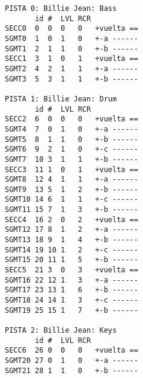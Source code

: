 \begin{verbatim}
PISTA 0: Billie Jean: Bass 
       id #  LVL RCR
SECC0  0  0  0   0   +vuelta ==
SGMT0  1  0  1   0   +-a ------
SGMT1  2  1  1   0   +-b ------
SECC1  3  1  0   1   +vuelta ==
SGMT2  4  2  1   1   +-a ------
SGMT3  5  3  1   1   +-b ------

PISTA 1: Billie Jean: Drum 
       id #  LVL RCR
SECC2  6  0  0   0   +vuelta ==
SGMT4  7  0  1   0   +-a ------
SGMT5  8  1  1   0   +-b ------
SGMT6  9  2  1   0   +-c ------
SGMT7  10 3  1   1   +-b ------
SECC3  11 1  0   1   +vuelta ==
SGMT8  12 4  1   1   +-a ------
SGMT9  13 5  1   2   +-b ------
SGMT10 14 6  1   1   +-c ------
SGMT11 15 7  1   3   +-b ------
SECC4  16 2  0   2   +vuelta ==
SGMT12 17 8  1   2   +-a ------
SGMT13 18 9  1   4   +-b ------
SGMT14 19 10 1   2   +-c ------
SGMT15 20 11 1   5   +-b ------
SECC5  21 3  0   3   +vuelta ==
SGMT16 22 12 1   3   +-a ------
SGMT17 23 13 1   6   +-b ------
SGMT18 24 14 1   3   +-c ------
SGMT19 25 15 1   7   +-b ------

PISTA 2: Billie Jean: Keys 
       id #  LVL RCR
SECC6  26 0  0   0   +vuelta ==
SGMT20 27 0  1   0   +-a ------
SGMT21 28 1  1   0   +-b ------

\end{verbatim}
